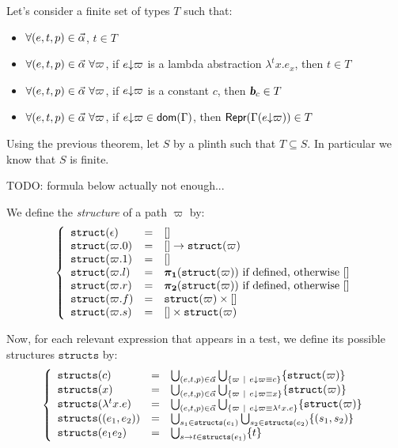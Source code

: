 \documentclass[a4paper]{article}
\theoremstyle{definition}
\begin{document}
    Let's consider a finite set of types $T$ such that:
    \begin{itemize}
      \item $\forall (e,t,p) \in \vec \alpha$, $t \in T$
      \item $\forall (e,t,p) \in \vec \alpha\ \forall \varpi$, if $e{\downarrow}\varpi$ is a lambda abstraction $\lambda^tx.e_x$, then $t \in T$
      \item $\forall (e,t,p) \in \vec \alpha\ \forall \varpi$, if $e{\downarrow}\varpi$ is a constant $c$, then $\basic{c} \in T$
      \item $\forall (e,t,p) \in \vec \alpha\ \forall \varpi$, if $e{\downarrow}\varpi \in \textsf{dom}(\Gamma)$, then $\textsf{Repr}(\Gamma(e{\downarrow}\varpi)) \in T$
    \end{itemize}

    Using the previous theorem, let $S$ by a plinth such that $T \subseteq S$. In particular we know that $S$ is finite.

    TODO: formula below actually not enough...

    We define the \textit{structure} of a path $\varpi$ by:
    \[
      \left\{
        \begin{array}{lcl}
          \texttt{struct}(\epsilon) & = & {[}] \\
          \texttt{struct}(\varpi.0) & = & {[}]\to \texttt{struct}(\varpi) \\
          \texttt{struct}(\varpi.1) & = & {[}] \\
          \texttt{struct}(\varpi.l) & = & \boldsymbol{\pi}_{\boldsymbol 1}(\texttt{struct}(\varpi)) \text{ if defined, otherwise []} \\
          \texttt{struct}(\varpi.r) & = & \boldsymbol{\pi}_{\boldsymbol 2}(\texttt{struct}(\varpi)) \text{ if defined, otherwise []} \\
          \texttt{struct}(\varpi.f) & = & \texttt{struct}(\varpi)\times {[}] \\
          \texttt{struct}(\varpi.s) & = & {[}]\times \texttt{struct}(\varpi)
        \end{array}  
      \right.
    \]

    Now, for each relevant expression that appears in a test, we define its possible structures $\texttt{structs}$ by:
    \[
      \left\{
        \begin{array}{lcl}
          \texttt{structs}(c) & = & \bigcup_{(e,t,p)\in\vec \alpha}\bigcup_{\{\varpi~|~e{\downarrow}\varpi \equiv c\}} \{ \texttt{struct}(\varpi) \} \\
          \texttt{structs}(x) & = & \bigcup_{(e,t,p)\in\vec \alpha}\bigcup_{\{\varpi~|~e{\downarrow}\varpi \equiv x\}} \{ \texttt{struct}(\varpi) \} \\
          \texttt{structs}(\lambda^tx.e) & = & \bigcup_{(e,t,p)\in\vec \alpha}\bigcup_{\{\varpi~|~e{\downarrow}\varpi \equiv \lambda^tx.e\}} \{ \texttt{struct}(\varpi) \} \\
          \texttt{structs}((e_1,e_2)) & = & \bigcup_{s_1\in\texttt{structs}(e_1)}\bigcup_{s_2\in\texttt{structs}(e_2)}  \{ (s_1,s_2) \} \\
          \texttt{structs}(e_1 e_2) & = & \bigcup_{s\to t\in\texttt{structs}(e_1)} \{ t \}
        \end{array}  
      \right.
    \]
\end{document}
